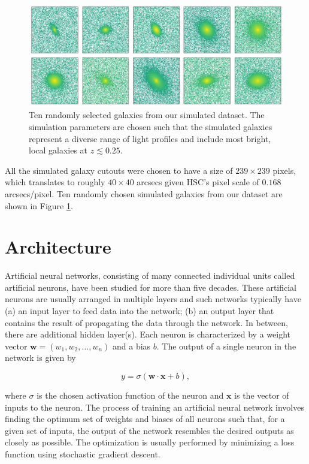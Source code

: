 \begin{figure}[htb]
    \centering
    \includegraphics[width
    =\textwidth]{random_sim_galaxies.png}
    \caption{Ten randomly selected galaxies from our simulated dataset. The simulation parameters are chosen such that the simulated galaxies represent a diverse range of light profiles and include most bright, local galaxies at $z \lesssim 0.25$.}
    \label{fig_c2:random_sim_galaxies}
\end{figure}

All the simulated galaxy cutouts were chosen to have a size of $239 \times 239$ pixels, which translates to roughly $40 \times 40$ arcsecs given HSC's pixel scale of $0.168$ arcsecs/pixel. Ten randomly chosen simulated galaxies from our dataset are shown in Figure \ref{fig_c2:random_sim_galaxies}. 


\section{\gampen{} Architecture} \label{sec_c2:cnn_description}

Artificial neural networks, consisting of many connected individual units called artificial neurons, have been studied for more than five decades. These artificial neurons are usually arranged in multiple layers and such networks typically have (a) an input layer to feed data into the network; (b) an output layer that contains the result of propagating the data through the network. In between, there are additional hidden layer(s). Each neuron is characterized by a weight vector $\bm{w}=(w_1,w_2,\ldots,w_n)$ and a bias $b$. The output of a single neuron in the network is given by 

\begin{equation}
y = \sigma(\bm{w} \cdot \bm{x} + b) ,
\label{eq:neuron_output}
\end{equation}

\noindent
where $\sigma$ is the chosen activation function of the neuron and $\bm{x}$ is the vector of inputs to the neuron. 
The process of training an artificial neural network involves finding the optimum set of weights and biases of all neurons such that, for a given set of inputs, the output of the network resembles the desired outputs as closely as possible. The optimization is usually performed by minimizing a loss function using stochastic gradient descent.

